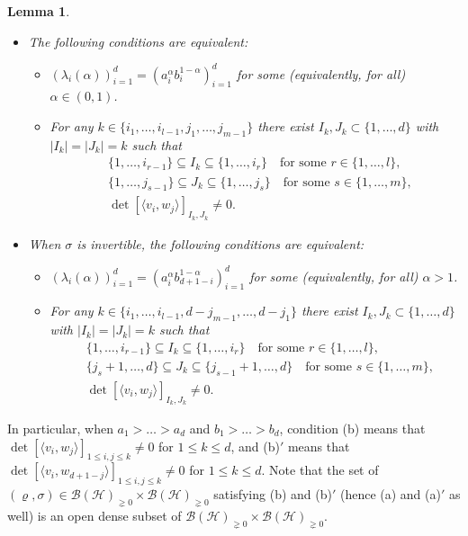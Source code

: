 \documentclass[unsortedaddress,superscriptaddress,pra,notitlepage]{revtex4}
\newtheorem{lemma}[definition]{Lemma}
\def\B{{\mathcal B}}
\def\rho{\varrho}
\def\pne{_{\gneq 0}}
\def\cH{\mathcal{H}}
\def\<{\langle}
\def\>{\rangle}
\def\<{\langle}
\def\>{\rangle}
\begin{document}
\begin{lemma}\label{L-1}
\begin{itemize}
\item[(1)] The following conditions are equivalent:
\begin{itemize}
\item[(a)] $(\lambda_i(\alpha))_{i=1}^d=(a_i^\alpha b_i^{1-\alpha})_{i=1}^d$ for some
(equivalently, for all) $\alpha\in(0,1)$.
\item[(b)] For any $k\in\{i_1,\ldots,i_{l-1},j_1,\ldots,j_{m-1}\}$ there exist
$I_k,J_k\subset\{1,\ldots,d\}$ with $|I_k|=|J_k|=k$ such that
\begin{align*}
&\{1,\ldots,i_{r-1}\}\subseteq I_k\subseteq\{1,\ldots,i_r\}\quad
\mbox{for some  $r\in\{1,\ldots,l\}$}, \\
&\{1,\ldots,j_{s-1}\}\subseteq J_k\subseteq\{1,\ldots,j_s\}\quad
\mbox{for some $s\in\{1,\ldots,m\}$}, \\
&\det[\<v_i,w_j\>]_{I_k,J_k}\ne0.
\end{align*}
\end{itemize}

\item[(2)] When $\sigma$ is invertible, the following conditions are equivalent:
\begin{itemize}
\item[(a)$'$] $(\lambda_i(\alpha))_{i=1}^d=(a_i^\alpha b_{d+1-i}^{1-\alpha})_{i=1}^d$ for
some (equivalently, for all) $\alpha>1$.
\item[(b)$'$] For any $k\in\{i_1,\ldots,i_{l-1},d-j_{m-1},\ldots,d-j_1\}$ there exist
$I_k,J_k\subset\{1,\ldots,d\}$ with $|I_k|=|J_k|=k$ such that
\begin{align*}
&\{1,\ldots,i_{r-1}\}\subseteq I_k\subseteq\{1,\ldots,i_r\}\quad
\mbox{for some $r\in\{1,\ldots,l\}$}, \\
&\{j_s+1,\ldots,d\}\subseteq J_k\subseteq\{j_{s-1}+1,\ldots,d\}\quad
\mbox{for some $s\in\{1,\ldots,m\}$}, \\
&\det[\<v_i,w_j\>]_{I_k,J_k}\ne0.
\end{align*}
\end{itemize}
\end{itemize}
\end{lemma}

In particular, when $a_1>\ldots>a_d$ and $b_1>\ldots>b_d$, condition (b) means
that $\det[\<v_i,w_j\>]_{1\le i,j\le k}\ne0$ for $1\le k\le d$, and (b)$'$ means that
$\det[\<v_i,w_{d+1-j}\>]_{1\le i,j\le k}\ne0$ for $1\le k\le d$. Note that the set of
$(\rho,\sigma)\in\B(\cH)\pne\times\B(\cH)\pne$ satisfying (b) and (b)$'$ (hence (a) and
(a)$'$ as well) is an open dense subset of $\B(\cH)\pne\times\B(\cH)\pne$.
\end{document}
